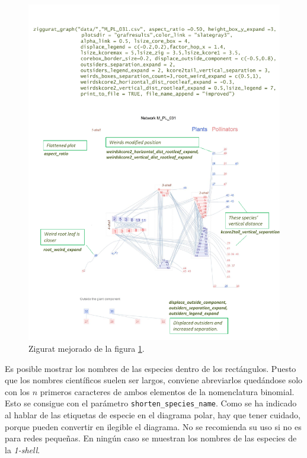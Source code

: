 \clearpage
\begin{figure}[hp!]
\centering
\includegraphics[scale=0.8]{ManFigs/M_PL_031_ziggurat_improved.pdf}
\caption {Zigurat mejorado de la figura \ref{fig:AKMAN_ziggurat_031}.}
\label{fig:AKMAN_ziggurat_031}
\end{figure}


\clearpage
Es posible mostrar los nombres de las especies dentro de los rectángulos. Puesto que los nombres científicos suelen ser largos, conviene abreviarlos quedándose solo con los $n$ primeros caracteres de ambos elementos de la nomenclatura binomial. Esto se consigue con el parámetro \texttt{shorten\_species\_name}. Como se ha indicado al hablar de las etiquetas de especie en el diagrama polar, hay que tener cuidado, porque pueden convertir en ilegible el diagrama. No se recomienda su uso si no es para redes pequeñas. En ningún caso se muestran los nombres de las especies de la \textit{1-shell}.


